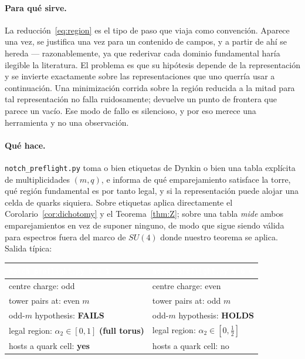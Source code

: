 \documentclass[11pt,a4paper]{article}
\begin{document}
\paragraph{Para qué sirve.} La reducción~\eqref{eq:region} es el tipo de paso que viaja como
convención. Aparece una vez, se justifica una vez para un contenido de campos, y a partir de
ahí se hereda --- razonablemente, ya que rederivar cada dominio fundamental haría ilegible la
literatura. El problema es que su hipótesis depende de la representación y se invierte
exactamente sobre las representaciones que uno querría usar a continuación. Una minimización
corrida sobre la región reducida a la mitad para tal representación no falla ruidosamente;
devuelve un punto de frontera que parece un vacío. Ese modo de fallo es silencioso, y por eso
merece una herramienta y no una observación.

\paragraph{Qué hace.} \texttt{notch\_preflight.py} toma o bien etiquetas de Dynkin o bien una
tabla explícita de multiplicidades $(m,q)$, e informa de qué emparejamiento satisface la
torre, qué región fundamental es por tanto legal, y si la representación puede alojar una
celda de quarks siquiera. Sobre etiquetas aplica directamente el Corolario~\ref{cor:dichotomy} y
el Teorema~\ref{thm:Z}; sobre una tabla \emph{mide} ambos emparejamientos en vez de suponer
ninguno, de modo que sigue siendo válida para espectros fuera del marco de $SU(4)$ donde
nuestro teorema se aplica. Salida típica:

\begin{center}\small
\begin{tabular}{ll}
\toprule
\rowcolor{hdrblue}
\textcolor{white}{\texttt{notch\_preflight.py 0 2 1}} & \textcolor{white}{\texttt{notch\_preflight.py 4 0 0}}\\
\midrule
centre charge: odd & centre charge: even\\
\rowcolor{softgrey}
tower pairs at: even $m$ & tower pairs at: odd $m$\\
odd-$m$ hypothesis: \textcolor{warmred}{\textbf{FAILS}} & odd-$m$ hypothesis: \textcolor{okgreen}{\textbf{HOLDS}}\\
\rowcolor{softgrey}
legal region: $\alpha_2\in[0,1]$ \textbf{(full torus)} & legal region: $\alpha_2\in[0,\tfrac12]$\\
hosts a quark cell: \textbf{yes} & hosts a quark cell: no\\
\bottomrule
\end{tabular}
\end{center}
\end{document}
